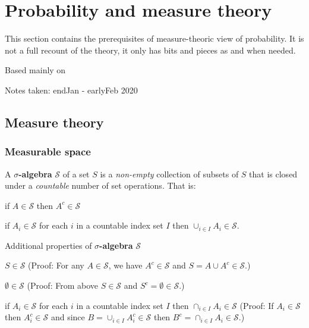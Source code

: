 \clearpage

\section{Probability and measure theory}

This section contains the prerequisites of measure-theoric view of probability.
It is not a full recount of the theory, it only has bits and pieces as and when needed.

\begin{notebox}
Based mainly on 

\hfill Notes taken: endJan - earlyFeb 2020 
\end{notebox}

\subsection{Measure theory}

\subsubsection{Measurable space}

\begin{definition}
A \textbf{$\sigma$-algebra} $\mathscr{S}$ of a set $S$ is a \emph{non-empty} collection of subsets of $S$ that is closed under a \emph{countable} number of set operations.
That is:
\begin{compactitem}
\item if $A \in \mathscr{S}$ then $A^c \in \mathscr{S}$
\item if $A_i \in \mathscr{S}$ for each $i$ in a countable index set $I$ then $\cup_{i \in I} A_i \in \mathscr{S}$.
\end{compactitem}
\end{definition}

Additional properties of \textbf{$\sigma$-algebra} $\mathscr{S}$
\begin{compactitem}
\item $S \in \mathscr{S}$ \hspace{0.5cm}
(Proof: For any $A \in \mathscr{S}$, we have $A^c \in \mathscr{S}$ and $S = A \cup A^c \in \mathscr{S}$.)
\item $\emptyset \in \mathscr{S}$ \hspace{0.5cm}
(Proof: From above $S \in \mathscr{S}$ and $S^c = \emptyset \in \mathscr{S}$.)
\item if $A_i \in \mathscr{S}$ for each $i$ in a countable index set $I$ then $\cap_{i \in I} A_i \in \mathscr{S}$ \hspace{0.5cm}
(Proof: If $A_i \in \mathscr{S}$ then $A_i^c \in \mathscr{S}$ and since $B = \cup_{i \in I} A_i^c \in \mathscr{S}$ then $B^c = \cap_{i \in I} A_i \in \mathscr{S}$.)
\end{compactitem}

